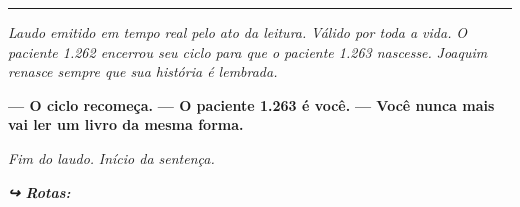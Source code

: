 \vspace{0.5em}\noindent\rule{\textwidth}{0.5pt}\vspace{0.5em}

\noindent \textit{Laudo emitido em tempo real pelo ato da leitura.}
\textit{Válido por toda a vida.}
\textit{O paciente 1.262 encerrou seu ciclo para que o paciente 1.263 nascesse.}
\textit{Joaquim renasce sempre que sua história é lembrada.}

\noindent \textbf{--- O ciclo recomeça.}
\textbf{--- O paciente 1.263 é você.}
\textbf{--- Você nunca mais vai ler um livro da mesma forma.}

\noindent \textit{Fim do laudo.}
\textit{Início da sentença.}

\vspace{0.5em}

\noindent\textit{\textbf{↪ Rotas:}  \rotasep {}}
